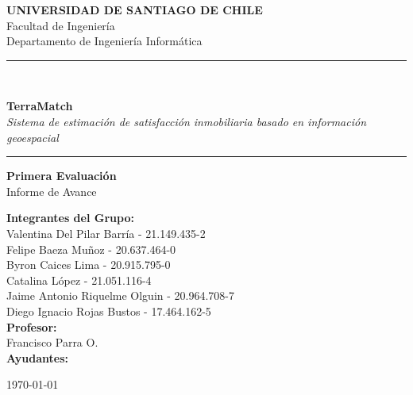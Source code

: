 
\begin{titlepage}
    \centering
    \vspace*{1cm}

    \Large{\textbf{UNIVERSIDAD DE SANTIAGO DE CHILE}}\\
    \large{Facultad de Ingeniería}\\
    \large{Departamento de Ingeniería Informática}\\

    \vspace{3cm}

    \rule{\textwidth}{0.5mm}\\
    \vspace{0.5cm}

    {\LARGE\textbf{TerraMatch}}\\
    \vspace{0.3cm}
    {\Large\textit{Sistema de estimación de satisfacción inmobiliaria basado en información geoespacial}}\\

    \vspace{0.5cm}
    \rule{\textwidth}{0.5mm}

    \vspace{2cm}

    {\Large\textbf{Primera Evaluación}}\\
    \vspace{0.5cm}
    {\large Informe de Avance}

    \vspace{3cm}

\begin{minipage}{0.8\textwidth}
    \begin{flushleft}
        \large
        \textbf{Integrantes del Grupo:}\\
        Valentina Del Pilar Barr\'ia - 21.149.435-2\\
        Felipe Baeza Mu\~noz - 20.637.464-0\\
        Byron Caices Lima - 20.915.795-0\\
        Catalina L\'opez - 21.051.116-4\\
        Jaime Antonio Riquelme Olguin - 20.964.708-7\\
        Diego Ignacio Rojas Bustos - 17.464.162-5\\
        \vspace{0.5cm}
        \textbf{Profesor:}\\
        Francisco Parra O.\\
        \vspace{0.5cm}
        \textbf{Ayudantes:}\\
    \end{flushleft}
\end{minipage}


    \vfill

    {\large \today}
\end{titlepage}
